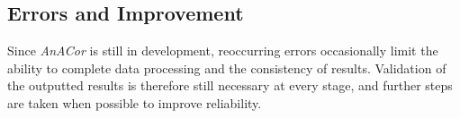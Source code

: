 






\subsection{Errors and Improvement}

Since \textit{AnACor} is still in development, reoccurring errors occasionally limit the ability to complete data processing and the consistency of results. Validation of the outputted results is therefore still necessary at every stage, and further steps are taken when possible to improve reliability.

